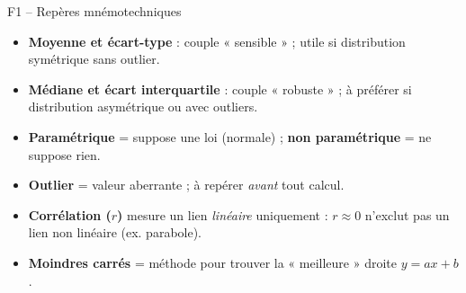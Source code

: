 \documentclass[11pt,a4paper]{article}
\begin{document}
\begin{vignetteCours}{F1 -- Repères mnémotechniques}
\begin{itemize}[leftmargin=*,itemsep=1pt]
  \item \textbf{Moyenne et écart-type} : couple « sensible » ; utile si distribution symétrique sans outlier.
  \item \textbf{Médiane et écart interquartile} : couple « robuste » ; à préférer si distribution asymétrique ou avec outliers.
  \item \textbf{Paramétrique} = suppose une loi (normale) ; \textbf{non paramétrique} = ne suppose rien.
  \item \textbf{Outlier} = valeur aberrante ; à repérer \emph{avant} tout calcul.
  \item \textbf{Corrélation ($r$)} mesure un lien \emph{linéaire} uniquement : $r \approx 0$ n'exclut pas un lien non linéaire (ex. parabole).
  \item \textbf{Moindres carrés} = méthode pour trouver la « meilleure » droite $y = ax + b$.
\end{itemize}
\end{vignetteCours}
\end{document}

